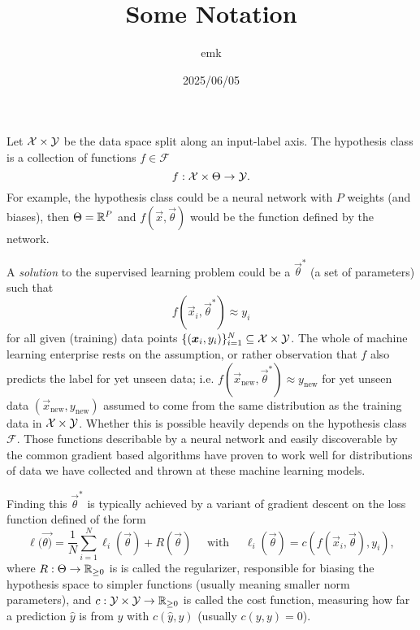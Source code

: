 \documentclass[12pt]{amsart}
\title{Some Notation}
\author{emk}
\date{2025/06/05}
\begin{document}
\maketitle

Let $\mathcal{X} \times \mathcal{Y}$ be the data space split along an input-label axis. The hypothesis class is a collection of functions $f \in \mathcal{F}$
\[
	f : \mathcal{X} \times \Theta \to \mathcal{Y}.
\]
For example, the hypothesis class could be a neural network with $P$ weights (and biases), then $\Theta = \mathbb{R}^P$ and $f(\vec{x}, \vec{\theta})$ would be the function defined by the network.

A \emph{solution} to the supervised learning problem could be a $\vec{\theta}^*$ (a set of parameters) such that $$f(\vec{x}_i, \vec{\theta}^*) \approx y_i$$
for all given (training) data points $\{(\mathbf{\boldsymbol{x}}_i, y_i)\}_{i = 1}^N \subseteq \mathcal{X} \times \mathcal{Y}$. The whole of machine learning enterprise rests on the assumption, or rather observation that $f$ also predicts the label for yet unseen data; i.e. $f(\vec{x}_{\text{new}}, \vec{\theta}^*) \approx y_{\text{new}}$ for yet unseen data $(\vec{x}_{\text{new}}, y_{\text{new}})$ assumed to come from the same distribution as the training data in $\mathcal{X} \times \mathcal{Y}$. Whether this is possible heavily depends on the hypothesis class $\mathcal{F}$. Those functions describable by a neural network and easily discoverable by the common gradient based algorithms have proven to work well for distributions of data we have collected and thrown at these machine learning models.

Finding this $\vec \theta^*$ is typically achieved by a variant of gradient descent on the loss function defined of the form
\begin{equation}\label{eq:lossfn}
	\ell(\vec{\theta)} = \frac{1}{N} \sum_{i = 1}^N \ell_i(\vec{\theta}) + R(\vec{\theta}) \quad \text{ with } \quad \ell_i(\vec{\theta}) = c(f(\vec{x}_i, \vec{\theta}), y_i),
\end{equation}
where $R :\Theta \to \mathbb{R}_{\geq 0 }$ is is called the regularizer, responsible for biasing the hypothesis space to simpler functions (usually meaning smaller norm parameters), and $c : \mathcal{Y} \times \mathcal{Y} \to \mathbb{R}_{\geq 0}$ is called the cost function, measuring how far a prediction $\hat y$ is from $y$ with  $c(\hat y, y)$ (usually $c(y, y) = 0$). 
\end{document}
